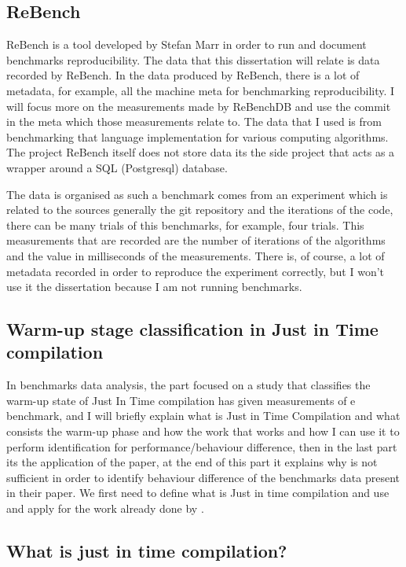 \documentclass[12pt,a4paper]{article}
\begin{document}
\subsection{ReBench}

ReBench is a tool developed by Stefan Marr in order to run and document benchmarks reproducibility. The data that this dissertation will relate is data recorded by ReBench. In the data produced by ReBench, there is a lot of metadata, for example, all the machine meta for benchmarking reproducibility. I will focus more on the measurements made by ReBenchDB and use the commit in the meta which those measurements relate to. The data that I used is from benchmarking that language implementation for various computing algorithms. The project ReBench itself does not store data its the side project that acts as a wrapper around a SQL (Postgresql) database.

The data is organised as such a benchmark comes from an experiment which is related to the sources generally the git repository and the iterations of the code, there can be many trials of this benchmarks, for example, four trials. This measurements that are recorded are the number of iterations of the algorithms and the value in milliseconds of the measurements. There is, of course, a lot of metadata recorded in order to reproduce the experiment correctly, but I won't use it the dissertation because I am not running benchmarks.

\subsection{Warm-up stage classification in Just in Time compilation}

In benchmarks data analysis, the part focused on a study that classifies the warm-up state of Just In Time compilation has given measurements of e benchmark, and I will briefly explain what is Just in Time Compilation and what consists the warm-up phase and how the work that \citep{barrett2017virtual} works and how I can use it to perform identification for performance/behaviour difference, then in the last part its the application of the paper, at the end of this part it explains why is not sufficient in order to identify behaviour difference of the benchmarks data present in their paper. We first need to define what is Just in time compilation and use and apply for the work already done by \citep{barrett2017virtual}.



\subsection{What is just in time compilation? }
\end{document}
